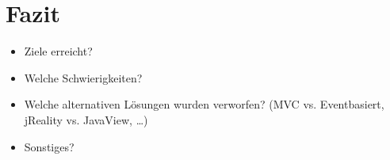 \section{Fazit}
    \begin{itemize}
        \item Ziele erreicht?
        \item Welche Schwierigkeiten?
        \item Welche alternativen Lösungen wurden verworfen? (MVC vs. Eventbasiert, jReality vs. JavaView, \dots)
        \item Sonstiges?
            
    \end{itemize}